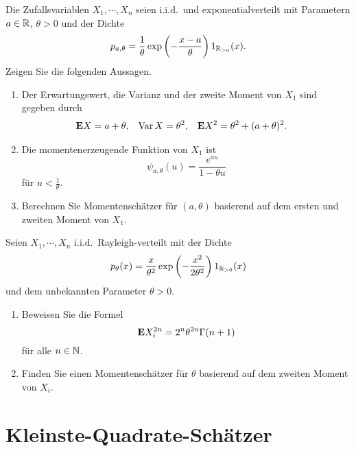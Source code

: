 Die Zufallsvariablen $X_1, \cdots, X_n$ seien i.i.d.\ und exponentialverteilt mit 
Parametern $a\in \mathbb R$, $\theta>0$ und der Dichte
\begin{equation*}
    p_{a,\theta} =\frac{1}{\theta} \exp \left( - \frac{x-a}{\theta} \right) 1_{\mathbb R_{>a}}(x).
\end{equation*}
Zeigen Sie die folgenden Aussagen.
\begin{enumerate}
    \item Der Erwartungswert, die Varianz und der zweite Moment von $X_1$ sind gegeben durch
        \begin{align*}
            \mathbf{E} X &= a+\theta, & \operatorname{Var} X &= \theta^2, & \mathbf{E} X^2 &= \theta^2 + (a+\theta)^2. 
        \end{align*}
    \item Die momentenerzeugende Funktion von $X_1$ ist 
        \begin{equation*}
            \psi_{a,\theta}(u) = \frac{e^{au}}{1- \theta u}
        \end{equation*}
        für $u<\frac{1}{\theta}$.
    \item Berechnen Sie Momentenschätzer für $(a,\theta)$ basierend auf dem ersten und zweiten 
        Moment von $X_1$. 
\end{enumerate}


 Seien $X_1, \cdots, X_n$ i.i.d.\ 
Rayleigh-verteilt mit der Dichte
\begin{equation*}
    p_\theta(x) = \frac{x}{\theta^2} \exp \left( - \frac{x^2}{2 \theta^2} \right) 1_{\mathbb R_{>0}}(x)
\end{equation*}
und dem unbekannten Parameter $\theta>0$. 
\begin{enumerate}
    \item Beweisen Sie die Formel
        \begin{equation*}
            \mathbf{E} X^{2n}_i = 2^{n} \theta^{2n} \Gamma(n+1)
        \end{equation*}
        für alle $n\in\mathbb N$. 
        
    \item Finden Sie einen Momentenschätzer für $\theta$ basierend auf dem zweiten Moment von $X_i$.

\end{enumerate}


\section{Kleinste-Quadrate-Schätzer}


